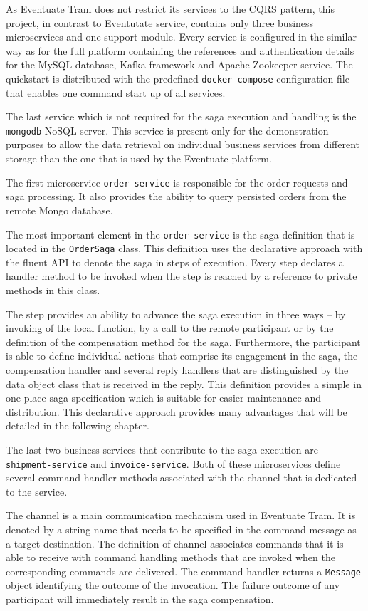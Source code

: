 \documentclass[oneside,
  digital, %
  table,   %
  nolof,     %
  nolot,     %
]{fithesis3}
\begin{document}
As Eventuate Tram does not restrict its services to the CQRS pattern, this project, in contrast to Eventutate service, contains only three business microservices and one support module. Every service is configured in the similar way as for the full platform containing the references and authentication details for the MySQL database, Kafka framework and Apache Zookeeper service. The quickstart is distributed with the predefined \texttt{docker-compose} configuration file that enables one command start up of all services.

The last service which is not required for the saga execution and handling is the \texttt{mongodb} NoSQL server. This service is present only for the demonstration purposes to allow the data retrieval on individual business services from different storage than the one that is used by the Eventuate platform.

The first microservice \texttt{order-service} is responsible for the order requests and saga processing. It also provides the ability to query persisted orders from the remote Mongo database.

The most important element in the \texttt{order-service} is the saga definition that is located in the \texttt{OrderSaga} class. This definition uses the declarative approach with the fluent API to denote the saga in steps of execution. Every step declares a handler method to be invoked when the step is reached by a reference to private methods in this class.

The step provides an ability to advance the saga execution in three ways -- by invoking of the local function, by a call to the remote participant or by the definition of the compensation method for the saga. Furthermore, the participant is able to define individual actions that comprise its engagement in the saga, the compensation handler and several reply handlers that are distinguished by the data object class that is received in the reply. This definition provides a simple in one place saga specification which is suitable for easier maintenance and distribution. This declarative approach provides many advantages that will be detailed in the following chapter.

The last two business services that contribute to the saga execution are \texttt{shipment-service} and \texttt{invoice-service}. Both of these microservices define several command handler methods associated with the channel that is dedicated to the service. 

The channel is a main communication mechanism used in Eventuate Tram. It is denoted by a string name that needs to be specified in the command message as a target destination. The definition of channel associates commands that it is able to receive with command handling methods that are invoked when the corresponding commands are delivered. The command handler returns a \texttt{Message} object identifying the outcome of the invocation. The failure outcome of any participant will immediately result in the saga compensation.
\end{document}
